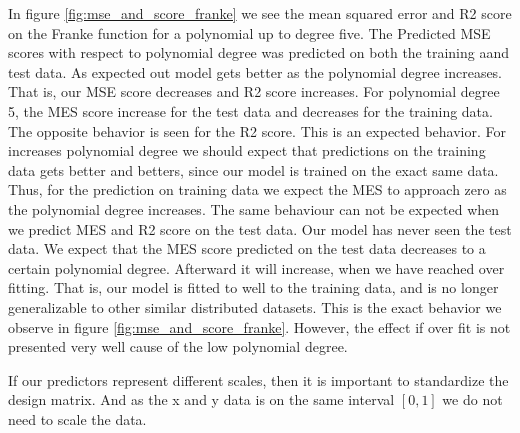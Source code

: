 In figure \ref{fig:mse_and_score_franke} we see the mean squared error and R2
score on the Franke function for a polynomial up to degree five. The Predicted
MSE scores with respect to polynomial degree was predicted on both the training
aand test data. As expected out model gets better as the polynomial degree
increases. That is, our MSE score decreases and R2 score increases. For
polynomial degree 5, the MES score increase for the test data and decreases for
the training data. The opposite behavior is seen for the R2 score. This is an
expected behavior. For increases polynomial degree we should expect that
predictions on the training data gets better and betters, since our model is
trained on the exact same data. Thus, for the prediction on training data we
expect the MES to approach zero as the polynomial degree increases. The same
behaviour can not be expected when we predict MES and R2 score on the test
data. Our model has never seen the test data. We expect that the MES score
predicted on the test data decreases to a certain polynomial degree. Afterward
it will increase, when we have reached over fitting. That is, our model is
fitted to well to the training data, and is no longer generalizable to other
similar distributed datasets. This is the exact behavior we observe in figure
\ref{fig:mse_and_score_franke}. However, the effect if over fit is not
presented very well cause of the low polynomial degree. 

If our
predictors represent different scales, then it is important to standardize the
design matrix. 
And as the x and y data is on the same interval $[0, 1]$ we do
not need to scale the data.



